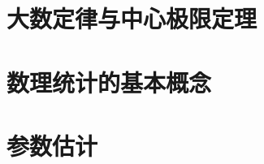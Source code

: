 \documentclass[lang=cn,math=mtpro2,11pt,scheme=chinese]{elegantbook}
\begin{document}
\section{大数定律与中心极限定理}

\section{数理统计的基本概念}

\section{参数估计}


\end{document}
